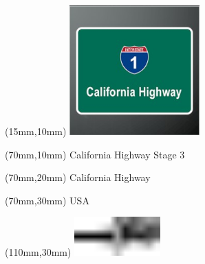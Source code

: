 \null\newpage
\begin{textblock*}{50mm}(15mm,10mm)%
\includegraphics[width=50mm]{LG/2015-05-20_00077.png}
\end{textblock*}
\begin{textblock*}{130mm}(70mm,10mm)%
{\fontsize{20}{20}\selectfont California Highway Stage 3}\\
\end{textblock*}
\begin{textblock*}{120mm}(70mm,20mm)%
{\fontsize{16}{16}\selectfont California Highway}\\
\end{textblock*}
\begin{textblock*}{120mm}(70mm,30mm)%
{\fontsize{12}{12}\selectfont USA}
\end{textblock*}
\begin{textblock*}{30mm}(110mm,30mm)%
\centering
\includegraphics[height=15mm]{icons/tofinish.pdf}
\end{textblock*}
